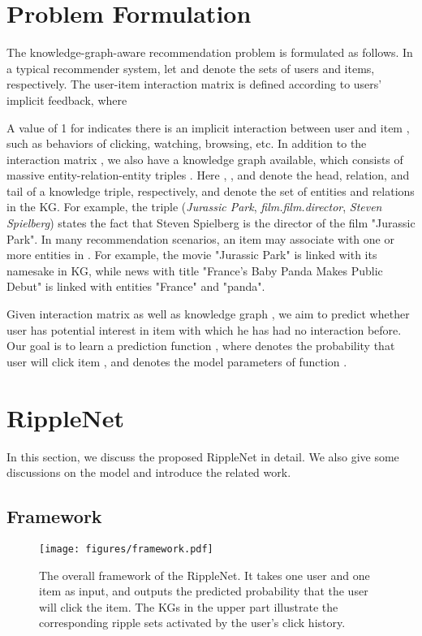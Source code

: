 \documentclass[sigconf]{acmart}
\begin{document}
	

\section{Problem Formulation}\label{sec:problem_formulation}
	The knowledge-graph-aware recommendation problem is formulated as follows.
	In a typical recommender system, let  and  denote the sets of users and items, respectively.
	The user-item interaction matrix  is defined according to users' implicit feedback, where
	
	A value of 1 for  indicates there is an implicit interaction between user  and item , such as behaviors of clicking, watching, browsing, etc.
	In addition to the interaction matrix , we also have a knowledge graph  available, which consists of massive entity-relation-entity triples .
	Here , , and  denote the head, relation, and tail of a knowledge triple, respectively,  and  denote the set of entities and relations in the KG.
	For example, the triple (\textit{Jurassic Park}, \textit{film.film.director}, \textit{Steven Spielberg}) states the fact that Steven Spielberg is the director of the film "Jurassic Park".
	In many recommendation scenarios, an item  may associate with one or more entities in .
	For example, the movie "Jurassic Park" is linked with its namesake in KG, while news with title "France's Baby Panda Makes Public Debut" is linked with entities "France" and "panda".
	
	Given interaction matrix  as well as knowledge graph , we aim to predict whether user  has potential interest in item  with which he has had no interaction before.
	Our goal is to learn a prediction function , where  denotes the probability that user  will click item , and  denotes the model parameters of function .
	
	
	

\section{RippleNet}\label{sec:ripple_networks}
	In this section, we discuss the proposed RippleNet in detail.
	We also give some discussions on the model and introduce the related work.
	
	\subsection{Framework}
		\begin{figure*}[t]
			\centering
  			\texttt{[image: figures/framework.pdf]}
  			\caption{The overall framework of the RippleNet. It takes one user and one item as input, and outputs the predicted probability that the user will click the item. The KGs in the upper part illustrate the corresponding ripple sets activated by the user's click history.}
  			\label{fig:framework}
		\end{figure*}	
		
\end{document}
